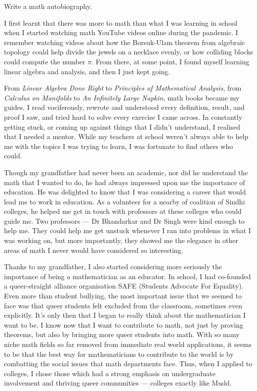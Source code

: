 \documentclass[12 pt, letterpaper]{hmcpset}
\begin{document}
\begin{problem}
	Write a math autobiography.
\end{problem}

\begin{solution}
	I first learnt that there was more to math than what I was learning in school when I started watching math YouTube videos online during the pandemic. I remember watching videos about how the Borsuk-Ulam theorem from algebraic topology could help divide the jewels on a necklace evenly, or how colliding blocks could compute the number $\pi$. From there, at some point, I found myself learning linear algebra and analysis, and then I just kept going.

	From \emph{Linear Algebra Done Right} to \emph{Principles of Mathematical Analysis}, from \emph{Calculus on Manifolds} to \emph{An Infinitely Large Napkin}, math books became my guides. I read vociferously, rewrote and understood every definition, result, and proof I saw, and tried hard to solve every exercise I came across. In constantly getting stuck, or coming up against things that I didn't understand, I realised that I needed a mentor. While my teachers at school weren't always able to help me with the topics I was trying to learn, I was fortunate to find others who could. 

	Though my grandfather had never been  an academic, nor did he understand the math that I wanted to do, he had always impressed upon me the importance of education. He was delighted to know that I was considering a career that would lead me to work in education. As a volunteer for a nearby of coalition of Sindhi colleges, he helped me get in touch with professors at these colleges who could guide me. Two professors --- Dr Bhandarkar and Dr Singh were kind enough to help me. They could help me get unstuck whenever I ran into problems in what I was working on, but more importantly, they showed me the elegance in other areas of math I never would have considered so interesting.

	Thanks to my grandfather, I also started considering more seriously the importance of being a mathematician as an educator. In school, I had co-founded a queer-straight alliance organisation SAFE (Students Advocate For Equality). Even more than student bullying, the most important issue that we seemed to face was that queer students felt excluded from the classroom, sometimes even explicitly. It's only then that I began to really think about the mathematician I want to be. I know now that I want to contribute to math, not just by proving theorems, but also by bringing more queer students into math. With so many niche math fields so far removed from immediate real world applications, it seems to be that the best way for mathematicians to contribute to the world is by combatting the social issues that math departments face. Thus, when I applied to colleges, I chose those which had a strong emphasis on undergraduate involvement and thriving queer communities --- colleges exactly like Mudd.


\end{solution}
\end{document}
